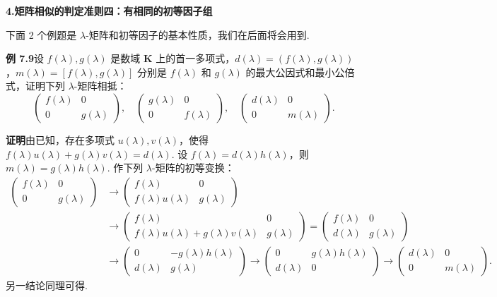 \documentclass[UTF8, 12pt, fontset=fandol, oneside]{ctexart}
\begin{document}
\noindent\textbf{4.\quad 矩阵相似的判定准则四：有相同的初等因子组}

下面 2 个例题是 $\lambda$-矩阵和初等因子的基本性质，我们在后面将会用到.

\noindent\textbf{例 7.9}\quad 设 $f(\lambda),g(\lambda)$ 是数域 $\mathbf{K}$ 上的首一多项式，$d(\lambda)=(f(\lambda),g(\lambda))$，$m(\lambda)=[f(\lambda),g(\lambda)]$ 分别是 $f(\lambda)$ 和 $g(\lambda)$ 的最大公因式和最小公倍式，证明下列 $\lambda$-矩阵相抵：
\[
\left(\begin{array}{cc}
f(\lambda) & 0\\
0 & g(\lambda)
\end{array}\right),\quad
\left(\begin{array}{cc}
g(\lambda) & 0\\
0 & f(\lambda)
\end{array}\right),\quad
\left(\begin{array}{cc}
d(\lambda) & 0\\
0 & m(\lambda)
\end{array}\right).
\]

\noindent\textbf{证明}\quad 由已知，存在多项式 $u(\lambda),v(\lambda)$，使得 $f(\lambda)u(\lambda)+g(\lambda)v(\lambda)=d(\lambda)$. 设 $f(\lambda)=d(\lambda)h(\lambda)$，则 $m(\lambda)=g(\lambda)h(\lambda)$. 作下列 $\lambda$-矩阵的初等变换：
\[
\begin{array}{rl}
\left(\begin{array}{cc}
f(\lambda) & 0\\
0 & g(\lambda)
\end{array}\right)
&\to
\left(\begin{array}{cc}
f(\lambda) & 0\\
f(\lambda)u(\lambda) & g(\lambda)
\end{array}\right)\\[1.2em]
&\to
\left(\begin{array}{cc}
f(\lambda) & 0\\
f(\lambda)u(\lambda)+g(\lambda)v(\lambda) & g(\lambda)
\end{array}\right)
=
\left(\begin{array}{cc}
f(\lambda) & 0\\
d(\lambda) & g(\lambda)
\end{array}\right)\\[1.2em]
&\to
\left(\begin{array}{cc}
0 & -g(\lambda)h(\lambda)\\
d(\lambda) & g(\lambda)
\end{array}\right)
\to
\left(\begin{array}{cc}
0 & g(\lambda)h(\lambda)\\
d(\lambda) & 0
\end{array}\right)
\to
\left(\begin{array}{cc}
d(\lambda) & 0\\
0 & m(\lambda)
\end{array}\right).
\end{array}
\]
另一结论同理可得.
\end{document}
